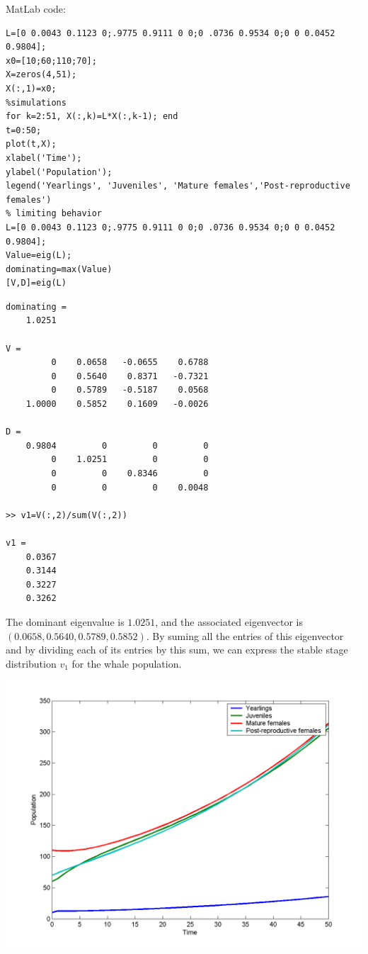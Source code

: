 MatLab code:
\begin{verbatim}
L=[0 0.0043 0.1123 0;.9775 0.9111 0 0;0 .0736 0.9534 0;0 0 0.0452 0.9804];
x0=[10;60;110;70];
X=zeros(4,51);
X(:,1)=x0;
%simulations
for k=2:51, X(:,k)=L*X(:,k-1); end
t=0:50;
plot(t,X);
xlabel('Time');
ylabel('Population');
legend('Yearlings', 'Juveniles', 'Mature females','Post-reproductive females')
% limiting behavior
L=[0 0.0043 0.1123 0;.9775 0.9111 0 0;0 .0736 0.9534 0;0 0 0.0452 0.9804];
Value=eig(L);
dominating=max(Value)
[V,D]=eig(L)
\end{verbatim}

\begin{verbatim}
dominating =
    1.0251

V =
         0    0.0658   -0.0655    0.6788
         0    0.5640    0.8371   -0.7321
         0    0.5789   -0.5187    0.0568
    1.0000    0.5852    0.1609   -0.0026

D =
    0.9804         0         0         0
         0    1.0251         0         0
         0         0    0.8346         0
         0         0         0    0.0048
         
>> v1=V(:,2)/sum(V(:,2))

v1 =
    0.0367
    0.3144
    0.3227
    0.3262         
\end{verbatim}

The dominant eigenvalue is $1.0251$, and the associated eigenvector is $(0.0658,0.5640,0.5789,0.5852)$. By suming all the entries of this eigenvector and by dividing each of its entries by this sum, we can express the stable stage distribution $v_1$ for the whale population.

\begin{center}
\includegraphics[width=.6\textwidth]{figs_steph/KillerWhales}
\end{center}














